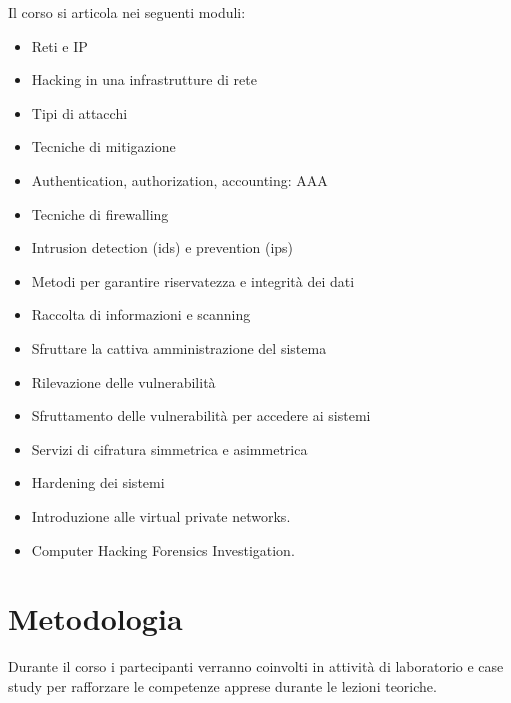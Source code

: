 Il corso si articola nei seguenti moduli:
\begin{itemize}
	
\item Reti e IP                                                 %

\item Hacking in una infrastrutture di rete       %

\item Tipi di attacchi                                          %

\item Tecniche di mitigazione                                   %

\item Authentication, authorization, accounting: AAA            %

\item Tecniche di firewalling                   %

\item Intrusion detection (ids)  e prevention (ips)   %

\item Metodi per garantire riservatezza e integrità dei dati    %

\item Raccolta di informazioni e scanning                       %

\item Sfruttare la cattiva amministrazione del sistema          %

\item Rilevazione delle vulnerabilità      %

\item Sfruttamento delle vulnerabilità per accedere ai sistemi  %

\item Servizi di cifratura  simmetrica e asimmetrica   %

\item Hardening dei sistemi                                 %

\item Introduzione alle virtual private networks.               %

\item Computer Hacking Forensics Investigation.               %

\end{itemize}
	
\section{Metodologia}

Durante il corso i partecipanti verranno coinvolti in attività di laboratorio e case study per rafforzare
le competenze apprese durante le lezioni teoriche.
